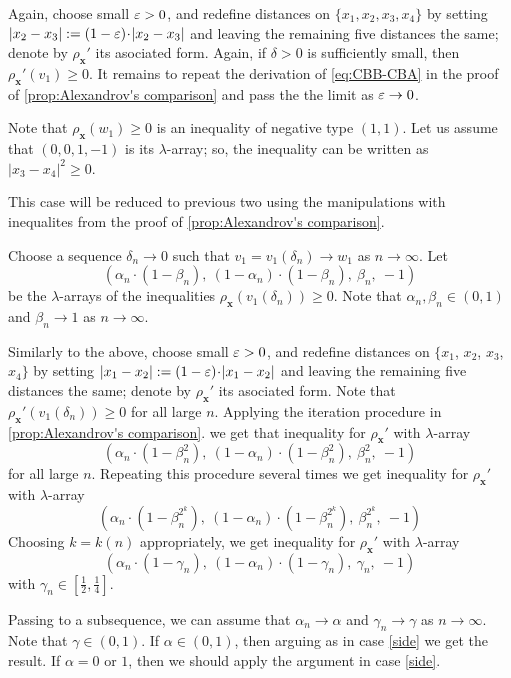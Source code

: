 \documentclass[a4paper,10pt]{article}
\begin{document}
Again, choose small $\varepsilon>0$, and redefine distances on $\{x_1,x_2,x_3,x_4\}$ by setting $|x_2-x_3|:=(1-\eps)\cdot|x_2-x_3|$ and leaving the remaining five distances the same; denote by $\rho_{\bm{x}}'$ its asociated form.
Again, if $\delta>0$ is sufficiently small, then $\rho_{\bm{x}}'(v_1)\ge0$.
It remains to repeat the derivation of \ref{eq:CBB-CBA} in the proof of \ref{prop:Alexandrov's comparison} and pass the the limit as $\varepsilon\to 0$.

Note that $\rho_{\bm{x}}(w_1)\ge0$ is an inequality of negative type $(1,1)$.
Let us assume that $(0,0, 1,-1)$ is its $\lambda$-array;
so, the inequality can be written as $|x_3-x_4|^2\ge 0$.

This case will be reduced to previous two using the manipulations with inequalites from the proof of \ref{prop:Alexandrov's comparison}.

Choose a sequence $\delta_n\to0$ such that $v_1=v_1(\delta_n)\to w_1$ as $n\to \infty$.
Let
\[(\alpha_n\cdot (1-\beta_n),\  (1-\alpha_n)\cdot(1-\beta_n),\  \beta_n,\ -1)\]
be the $\lambda$-arrays of the inequalities $\rho_{\bm{x}}(v_1(\delta_n))\ge 0$.
Note that $\alpha_n,\beta_n\in(0,1)$ and $\beta_n\to 1$ as $n\to\infty$.

Similarly to the above, choose small $\varepsilon>0$, and redefine distances on $\{x_1$, $x_2$, $x_3$, $x_4\}$ by setting $|x_1-x_2|:=(1-\eps)\cdot|x_1-x_2|$ and leaving the remaining five distances the same; denote by $\rho_{\bm{x}}'$ its asociated form.
Note that $\rho_{\bm{x}}'(v_1(\delta_n))\ge0$ for all large $n$.
Applying the iteration procedure in \ref{prop:Alexandrov's comparison}.
we get that inequality for $\rho_{\bm{x}}'$ with $\lambda$-array
\[(\alpha_n\cdot (1-\beta_n^2),\  (1-\alpha_n)\cdot(1-\beta_n^2),\  \beta_n^2,\ -1)\]
for all large $n$.
Repeating this procedure several times we get inequality for $\rho_{\bm{x}}'$ with $\lambda$-array
\[(\alpha_n\cdot (1-\beta_n^{2^k}),\  (1-\alpha_n)\cdot(1-\beta_n^{2^k}),\  \beta_n^{2^k},\ -1)\]
Choosing $k=k(n)$ appropriately, we get inequality for $\rho_{\bm{x}}'$ with $\lambda$-array
\[(\alpha_n\cdot (1-\gamma_n),\  (1-\alpha_n)\cdot(1-\gamma_n),\  \gamma_n,\ -1)\]
with $\gamma_n\in[\tfrac12,\tfrac14]$.

Passing to a subsequence, we can assume that $\alpha_n\to \alpha$ and $\gamma_n\to \gamma$ as $n\to \infty$.
Note that $\gamma\in (0,1)$.
If $\alpha\in (0,1)$, then arguing as in case \ref{side} we get the result.
If $\alpha=0$ or $1$, then we should apply the argument in case \ref{side}.
\qeds
\end{document}
